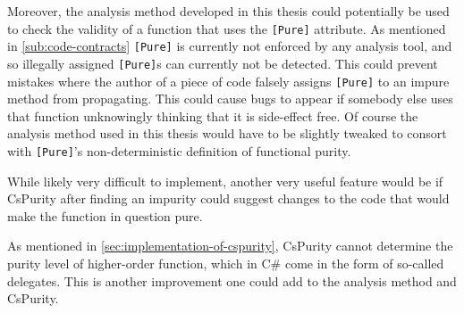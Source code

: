 \documentclass[a4paper,12pt]{article}
\begin{document}
Moreover, the analysis method developed in this thesis could potentially be used to check the validity of a function that uses the \texttt{[Pure]} attribute. As mentioned in \autoref{sub:code-contracts} \texttt{[Pure]} is currently not enforced by any analysis tool, and so illegally assigned \texttt{[Pure]}s can currently not be detected. This could prevent mistakes where the author of a piece of code falsely assigns \texttt{[Pure]} to an impure method from propagating. This could cause bugs to appear if somebody else uses that function unknowingly thinking that it is side-effect free. Of course the analysis method used in this thesis would have to be slightly tweaked to consort with \texttt{[Pure]}'s non-deterministic definition of functional purity.

While likely very difficult to implement, another very useful feature would be if CsPurity after finding an impurity could suggest changes to the code that would make the function in question pure.

As mentioned in \autoref{sec:implementation-of-cspurity}, CsPurity cannot determine the purity level of higher-order function, which in C\# come in the form of so-called delegates. This is another improvement one could add to the analysis method and CsPurity.



\end{document}
